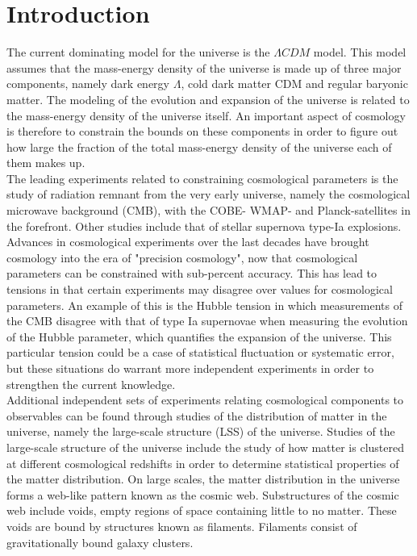 \chapter{Introduction}
The current dominating model for the universe is the $\Lambda CDM$ model. This model assumes that the mass-energy density of the universe is made up of three major components, namely dark energy $\Lambda$, cold dark matter CDM and regular baryonic matter. The modeling of the evolution and expansion of the universe is related to the mass-energy density of the universe itself. An important aspect of cosmology is therefore to constrain the bounds on these components in order to figure out how large the fraction of the total mass-energy density of the universe each of them makes up.\\\indent
The leading experiments related to constraining cosmological parameters is the study of radiation remnant from the very early universe, namely the cosmological microwave background (CMB)\cite{1965cmb}, with the COBE-\cite{Smoot_1999} WMAP-\cite{Wmap} and Planck-satellites\cite{planckvi} in the forefront. Other studies include that of stellar supernova type-Ia explosions\cite{Pantheon}. Advances in cosmological experiments over the last decades have brought cosmology into the era of "precision cosmology", now that cosmological parameters can be constrained with sub-percent accuracy. This has lead to tensions in that certain experiments may disagree over values for cosmological parameters. An example of this is the Hubble tension in which measurements of the CMB disagree with that of type Ia supernovae when measuring the evolution of the Hubble parameter, which quantifies the expansion of the universe. This particular tension could be a case of statistical fluctuation or systematic error, but these situations do warrant more independent experiments in order to strengthen the current knowledge.\\\indent Additional independent sets of experiments relating cosmological components to observables can be found through studies of the distribution of matter in the universe, namely the large-scale structure (LSS) of the universe. Studies of the large-scale structure of the universe include the study of how matter is clustered at different cosmological redshifts in order to determine statistical properties of the matter distribution. On large scales, the matter distribution in the universe forms a web-like pattern known as the cosmic web\cite{bondweb}. Substructures of the cosmic web include voids, empty regions of space containing little to no matter. These voids are bound by structures known as filaments. Filaments consist of gravitationally bound galaxy clusters. \\\indent

